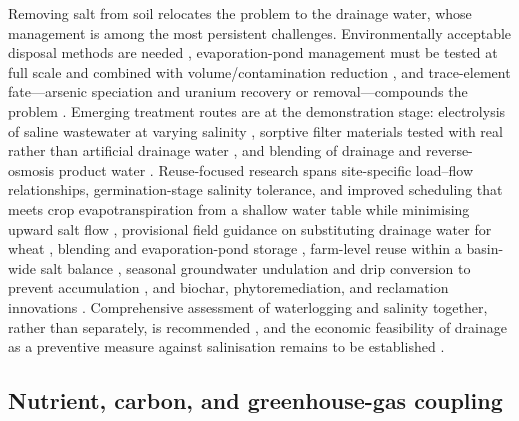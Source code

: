 \documentclass[11pt]{article}
\begin{document}
Removing salt from soil relocates the problem to the drainage water, whose
management is among the most persistent challenges. Environmentally acceptable
disposal methods are needed \parencite{Ayars2014,Steppuhn2006}, evaporation-pond
management must be tested at full scale and combined with volume/contamination
reduction \parencite{BRADFORD1991}, and trace-element fate---arsenic speciation and
uranium recovery or removal---compounds the problem
\parencite{Gao2007,Duff1997,Gao2003}. Emerging treatment routes are at the
demonstration stage: electrolysis of saline wastewater at varying salinity
\parencite{Yang2023}, sorptive filter materials tested with real rather than
artificial drainage water \parencite{Pugliese2023}, and blending of drainage and
reverse-osmosis product water \parencite{Singh2020d}. Reuse-focused research spans
site-specific load--flow relationships, germination-stage salinity tolerance, and
improved scheduling that meets crop evapotranspiration from a shallow water table
while minimising upward salt flow \parencite{WESTCOT1988}, provisional field
guidance on substituting drainage water for wheat \parencite{Sharma1998}, blending
and evaporation-pond storage \parencite{Datta2002}, farm-level reuse within a
basin-wide salt balance \parencite{Qureshi2008}, seasonal groundwater undulation
and drip conversion to prevent accumulation \parencite{Mirlas2021,Dou2022,Singh2019},
and biochar, phytoremediation, and reclamation innovations
\parencite{Liu2025f,Steppuhn2017,Youngs2000}. Comprehensive assessment of
waterlogging and salinity together, rather than separately, is recommended
\parencite{Valipour2014}, and the economic feasibility of drainage as a preventive
measure against salinisation remains to be established
\parencite{Datta2000,HalbacCotoaraZamfir2022}.

\subsection{Nutrient, carbon, and greenhouse-gas coupling}
\end{document}
